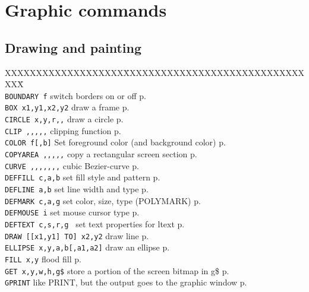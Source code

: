 \section{Graphic commands}
\subsection{Drawing and painting}
\begin{tabbing}
XXXXXXXXXXXXXXXXXXX\=XXXXXXXXXXXXXXXXXXXXXXXXXXXXXXXX\=\kill\\
\verb|BOUNDARY f| 	\> switch borders on or off\> p.\pageref{BOUNDARY}\\
\verb|BOX x1,y1,x2,y2| 	\> draw a frame\> p.\pageref{BOX}\\
\verb|CIRCLE x,y,r,,|	\> draw a circle\> p.\pageref{CIRCLE}\\
\verb|CLIP ,,,,,|  	\> clipping function\> p.\pageref{CLIP}\\
\verb|COLOR f[,b]|	\> Set foreground color (and background color)\> p.\pageref{COLOR}\\
\verb|COPYAREA ,,,,,|	\> copy a rectangular screen section \> p.\pageref{COPYAREA}\\
\verb|CURVE ,,,,,,,|  	\> cubic Bezier-curve\> p.\pageref{CURVE}\\
\verb|DEFFILL c,a,b|	\> set fill style and pattern\> p.\pageref{DEFFILL}\\
\verb|DEFLINE a,b|	\> set line width and type\> p.\pageref{DEFLINE}\\
\verb|DEFMARK c,a,g|	\> set color, size, type (POLYMARK)\> p.\pageref{DEFMARK}\\
\verb|DEFMOUSE i|	\> set mouse cursor type\> p.\pageref{DEFMOUSE}\\
\verb|DEFTEXT c,s,r,g |	\> set text properties for ltext\> p.\pageref{DEFTEXT}\\
\verb|DRAW [[x1,y1] TO] x2,y2| \> draw line\> p.\pageref{DRAW}\\
\verb|ELLIPSE x,y,a,b[,a1,a2]| \> draw an ellipse\> p.\pageref{ELLIPSE}\\
\verb|FILL x,y|  	\> flood fill \> p.\pageref{FILL}\\
\verb|GET x,y,w,h,g$|  	\>  store a portion of the screen bitmap in  g\$\> p.\pageref{GET}\\
\verb|GPRINT|  		\>  like PRINT, but the output goes to the graphic window\> p.\pageref{GPRINT}\\


\end{tabbing}
